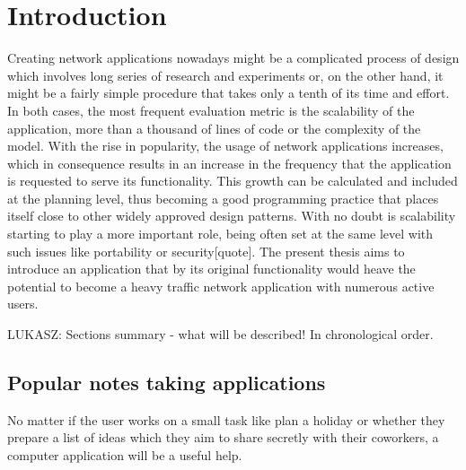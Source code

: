 \chapter{Introduction}
\label{sec:Introduction}
Creating network applications nowadays might be a complicated process of design which involves long series of research and experiments or, on the other hand, it might be a fairly simple procedure that takes only a tenth of its time and effort. In both cases, the most frequent evaluation metric is the scalability of the application, more than a thousand of lines of code or the complexity of the model. With the rise in popularity, the usage of network applications increases, which in consequence results in an increase in the frequency that the application is requested to serve its functionality. This growth can be calculated and included at the planning level, thus becoming a good programming practice that places itself close to other widely approved design patterns. With no doubt is scalability starting to play a more important role, being often set at the same level with such issues like portability or security[quote]. The present thesis aims to introduce an application that by its original functionality would heave the potential to become a heavy traffic network application with numerous active users.

LUKASZ: Sections summary - what will be described! In chronological order.

\section{Popular notes taking applications}\label{sec:popular_apps} 
No matter if the user works on a small task like plan a holiday or whether they prepare a list of ideas which they aim to share secretly with their coworkers, a computer application will be a useful help.     

